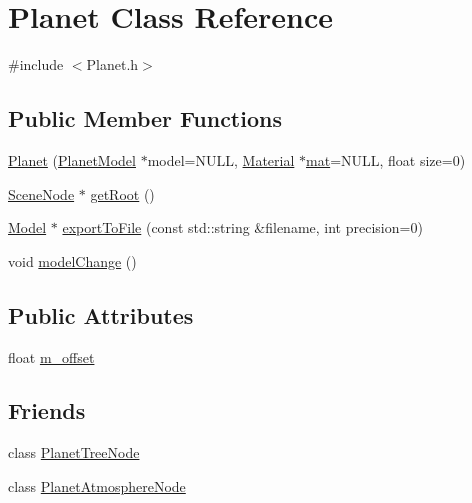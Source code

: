 \hypertarget{class_planet}{\section{Planet Class Reference}
\label{class_planet}
}


{\ttfamily \#include $<$Planet.\+h$>$}

\subsection*{Public Member Functions}
\begin{DoxyCompactItemize}
\item 
\hyperlink{class_planet_adbd5bfd2c35ff4b226a586ad9b2cf3a7}{Planet} (\hyperlink{class_planet_model}{Planet\+Model} $\ast$model=N\+U\+L\+L, \hyperlink{class_agmd_1_1_material}{Material} $\ast$\hyperlink{_examples_2_planet_2_app_8cpp_ab1c3784ff3dfc4e8cd95bfcb681f720b}{mat}=N\+U\+L\+L, float size=0)
\item 
\hyperlink{class_agmd_1_1_scene_node}{Scene\+Node} $\ast$ \hyperlink{class_planet_aa5d2b6140b10e3a96b4ff9819b077e92}{get\+Root} ()
\item 
\hyperlink{class_agmd_1_1_model}{Model} $\ast$ \hyperlink{class_planet_a9ec6cc5ceee6c943d3b614a776f524d8}{export\+To\+File} (const std\+::string \&filename, int precision=0)
\item 
void \hyperlink{class_planet_a5c36f98f4e249a3e20d020e4be2ae7d6}{model\+Change} ()
\end{DoxyCompactItemize}
\subsection*{Public Attributes}
\begin{DoxyCompactItemize}
\item 
float \hyperlink{class_planet_a6886b414f3571371259ef5bc7db4e26d}{m\+\_\+offset}
\end{DoxyCompactItemize}
\subsection*{Friends}
\begin{DoxyCompactItemize}
\item 
class \hyperlink{class_planet_aadf4a71cd4cc00013a9284c5fa7e2f6c}{Planet\+Tree\+Node}
\item 
class \hyperlink{class_planet_a5fa68e2c0bc4ffbb3f6f8e1b77293ade}{Planet\+Atmosphere\+Node}
\end{DoxyCompactItemize}


